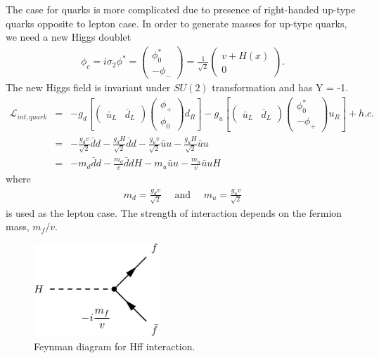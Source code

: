 The case for quarks is more complicated due to presence of right-handed up-type 
quarks opposite to lepton case. In order to generate masses for up-type 
quarks, we need a new Higgs doublet 
\begin{eqnarray} 
\phi_c 
= i \sigma_2 \phi^* 
=  \left(  \begin{array}{c} \phi_0^* \\ -\phi_- \end{array} \right) 
=  \frac{1}{\sqrt{2}} \left(  \begin{array}{c} v + H(x) \\ 0 \end{array} \right). 
\end{eqnarray} 
The new Higgs field is invariant under $SU(2)$ transformation and has Y = -1. 
\begin{eqnarray} 
\mathcal{L}_{int, quark} 
&=& 
-g_{d} \left[ 
\left(  \begin{array}{cc} \bar{u}_L & \bar{d}_L \end{array} \right)
\left(  \begin{array}{c} \phi_+  \\ \phi_0 \end{array} \right) d_R  \right]
-g_{u} \left[ 
\left(  \begin{array}{cc} \bar{u}_L & \bar{d}_L \end{array} \right)
\left(  \begin{array}{c} \phi_0^*  \\ -\phi_+ \end{array} \right) u_R  \right] 
+ h.c. \\
&=&  
-\frac{g_d v}{\sqrt{2}} \bar{d}d - \frac{g_d H}{\sqrt{2}} \bar{d}d  
-\frac{g_u v}{\sqrt{2}} \bar{u}u - \frac{g_u H}{\sqrt{2}} \bar{u}u \\
&=&  
- m_d \bar{d}d  -\frac{m_d}{v} \bar{d}d H
- m_u \bar{u}u  -\frac{m_u}{v} \bar{u}u H
\end{eqnarray} 
where 
\begin{eqnarray} 
m_d = \frac{g_d v}{\sqrt{2}} \quad \textrm{ and } \quad   
m_u = \frac{g_u v}{\sqrt{2}}
\end{eqnarray} 
is used as the lepton case. The strength of interaction depends on the 
fermion mass, $m_f / v$. 
\begin{figure}[htp]
\centering
\includegraphics[height=3.5cm]{figures/FD_HFFterm.pdf}
\caption{ Feynman diagram for Hff interaction.}
\label{fig:fd_HFFterm}
\end{figure}

